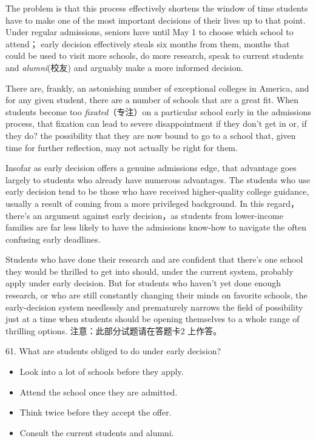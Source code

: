 \documentclass[UTF8,11pt]{ctexart}
\begin{document}
The problem is that this process effectively shortens the window of time students have to make one of the most important decisions of their lives up to that point. Under regular admissions, seniors have until May 1 to choose which school to attend； early decision effectively steals six months from them, months that could be used to visit more schools, do more research, speak to current students and\textit{ alumni}(校友) and arguably make a more informed decision.


There are, frankly, an astonishing number of exceptional colleges in America, and for any given student, there are a number of schools that are a great fit. When students become too\textit{ fixated}（专注）on a particular school early in the admissions process, that fixation can lead to severe disappointment if they don’t get in or, if they do? the possibility that they are now bound to go to a school that, given time for further reflection, may not actually be right for them.


Insofar as early decision offers a genuine admissions edge, that advantage goes largely to students who already have numerous advantages. The students who use early decision tend to be those who have received higher-quality college guidance, usually a result of coming from a more privileged background. In this regard，there’s an argument against early decision，as students from lower-income families are far less likely to have the admissions know-how to navigate the often confusing early deadlines.


Students who have done their research and are confident that there’s one school they would be thrilled to get into should, under the current system, probably apply under early decision. But for students who haven’t yet done enough research, or who are still constantly changing their minds on favorite schools, the early-decision system needlessly and prematurely narrows the field of possibility just at a time when students should be opening themselves to a whole range of thrilling options. 注意：此部分试题请在答题卡2 上作答。


61. What are students obliged to do under early decision?


\begin{itemize}[leftmargin=2em,itemsep=.2em,topsep=.4em]\item[A.] Look into a lot of schools before they apply.
\item[B.] Attend the school once they are admitted.
\item[C.] Think twice before they accept the offer.
\item[D.] Consult the current students and alumni.
\end{itemize}
\end{document}
